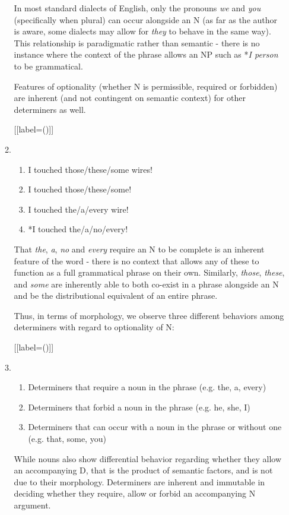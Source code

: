 \documentclass[12pt]{article}
\begin{document}
\begin{enumerate}[label=\textbf{\arabic*.}]
\begin{enumerate}[label=(\arabic*)]
In most standard dialects of English, only the pronouns \emph{we} and \emph{you} (specifically when plural) can occur alongside an N (as far as the author is aware, some dialects may allow for \emph{they} to behave in the same way). This relationship is paradigmatic rather than semantic - there is no instance where the context of the phrase allows an NP such as *\emph{I person} to be grammatical.

Features of optionality (whether N is permissible, required or forbidden) are inherent (and not contingent on semantic context) for other determiners as well.

[{[label=(\arabic*)]}]
\item
\begin{enumerate}[label=\roman*.]
\item I touched those/these/some wires!
\item I touched those/these/some!
\item I touched the/a/every wire!
\item *I touched the/a/no/every!
\end{enumerate}

That \emph{the}, \emph{a}, \emph{no} and \emph{every} require an N to be complete is an inherent feature of the word - there is no context that allows any of these to function as a full grammatical phrase on their own. Similarly, \emph{those}, \emph{these}, and \emph{some} are inherently able to both co-exist in a phrase alongside an N and be the distributional equivalent of an entire phrase.

Thus, in terms of morphology, we observe three different behaviors among determiners with regard to optionality of N:

[{[label=(\arabic*)]}]
\item
\begin{enumerate}[label=\roman*.]
\item Determiners that require a noun in the phrase (e.g. the, a, every)
\item Determiners that forbid a noun in the phrase (e.g. he, she, I)
\item Determiners that can occur with a noun in the phrase or without one (e.g. that, some, you)
\end{enumerate}

While nouns also show differential behavior regarding whether they allow an accompanying D, that is the product of semantic factors, and is not due to their morphology. Determiners are inherent and immutable in deciding whether they require, allow or forbid an accompanying N argument.


\end{enumerate}
\end{enumerate}
\end{document}
